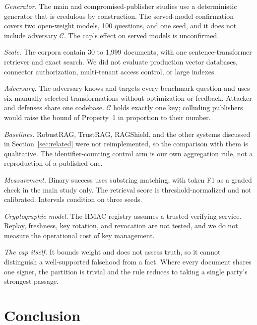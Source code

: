 \documentclass[lettersize,journal]{IEEEtran}
\newcommand{\AdvC}{\mathcal{C}}
\begin{document}
\emph{Generator.} The main and compromised-publisher studies use a deterministic generator
that is credulous by construction. The served-model confirmation covers two open-weight
models, 100 questions, and one seed, and it does not include adversary $\AdvC$. The cap's
effect on served models is unconfirmed.

\emph{Scale.} The corpora contain 30 to 1,999 documents, with one sentence-transformer
retriever and exact search. We did not evaluate production vector databases, connector
authorization, multi-tenant access control, or large indexes.

\emph{Adversary.} The adversary knows and targets every benchmark question and uses six
manually selected transformations without optimization or feedback. Attacker and defenses
share one codebase. $\AdvC$ holds exactly one key; colluding publishers would raise the bound
of Property~1 in proportion to their number.

\emph{Baselines.} RobustRAG, TrustRAG, RAGShield, and the other systems discussed in
Section~\ref{sec:related} were not reimplemented, so the comparison with them is qualitative.
The identifier-counting control arm is our own aggregation rule, not a reproduction of a
published one.

\emph{Measurement.} Binary success uses substring matching, with token F1 as a graded check
in the main study only. The retrieval score is threshold-normalized and not calibrated.
Intervals condition on three seeds.

\emph{Cryptographic model.} The HMAC registry assumes a trusted verifying service. Replay,
freshness, key rotation, and revocation are not tested, and we do not measure the operational
cost of key management.

\emph{The cap itself.} It bounds weight and does not assess truth, so it cannot distinguish a
well-supported falsehood from a fact. Where every document shares one signer, the partition is
trivial and the rule reduces to taking a single party's strongest passage.

\section{Conclusion}
\label{sec:conclusions}
\end{document}

